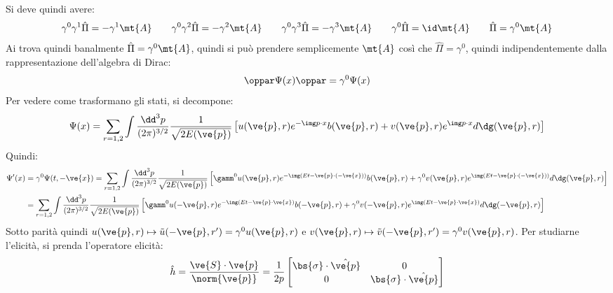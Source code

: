 Si deve quindi avere:
\begin{equation*}
  \gamma^0 \gamma^1 \hat{\Pi} = - \gamma^1 \mt{A}
  \qquad
  \gamma^0 \gamma^2 \hat{\Pi} = - \gamma^2 \mt{A}
  \qquad
  \gamma^0 \gamma^3 \hat{\Pi} = - \gamma^3 \mt{A}
  \qquad
  \gamma^0 \hat{\Pi} = \id \mt{A}
  \qquad
  \hat{\Pi} = \gamma^0 \mt{A}
\end{equation*}
Ai trova quindi banalmente $ \hat{\Pi} = \gamma^0 \mt{A} $, quindi si può prendere semplicemente $ \mt{A} $ così che $ \hat{\Pi} = \gamma^0 $, quindi indipendentemente dalla rappresentazione dell'algebra di Dirac:
\begin{equation}
  \oppar \Psi(x) \oppar = \gamma^0 \Psi(x)
\end{equation}
Per vedere come trasformano gli stati, si decompone:
\begin{equation*}
  \Psi(x) = \sum_{r = 1,2} \int \frac{\dd^3p}{(2\pi)^{3/2}} \frac{1}{\sqrt{2E(\ve{p})}} \left[ u(\ve{p},r) e^{-\img p \cdot x} b(\ve{p},r) + v(\ve{p},r) e^{\img p \cdot x} d\dg(\ve{p},r) \right]
\end{equation*}
Quindi:
\begin{equation*}
  \begin{split}
    \Psi'(x)
    & = \gamma^0 \Psi(t,-\ve{x}) = \sum_{r = 1,2} \int \frac{\dd^3p}{(2\pi)^{3/2}} \frac{1}{\sqrt{2E(\ve{p})}} \left[ \gamm^0 u(\ve{p},r) e^{-\img (Et - \ve{p} \cdot (-\ve{x}))} b(\ve{p},r) + \gamma^0 v(\ve{p},r) e^{\img (Et - \ve{p} \cdot (-\ve{x}))} d\dg(\ve{p},r) \right] \\
    & = \sum_{r = 1,2} \int \frac{\dd^3p}{(2\pi)^{3/2}} \frac{1}{\sqrt{2E(\ve{p})}} \left[ \gamm^0 u(-\ve{p},r) e^{-\img (Et - \ve{p} \cdot \ve{x})} b(-\ve{p},r) + \gamma^0 v(-\ve{p},r) e^{\img (Et - \ve{p} \cdot \ve{x})} d\dg(-\ve{p},r) \right] \\
  \end{split}
\end{equation*}
Sotto parità quindi $ u(\ve{p},r) \mapsto \tilde{u}(-\ve{p},r') = \gamma^0 u(\ve{p},r) $ e $ v(\ve{p},r) \mapsto \tilde{v}(-\ve{p},r') = \gamma^0 v(\ve{p},r) $. Per studiarne l'elicità, si prenda l'operatore elicità:
\begin{equation*}
  \hat{h} = \frac{\ve{S} \cdot \ve{p}}{\norm{\ve{p}}} = \frac{1}{2p}
  \begin{bmatrix}
    \bs{\sigma} \cdot \hat{\ve{p}} & 0 \\ 0 & \bs{\sigma} \cdot \hat{\ve{p}}
  \end{bmatrix}
\end{equation*}
